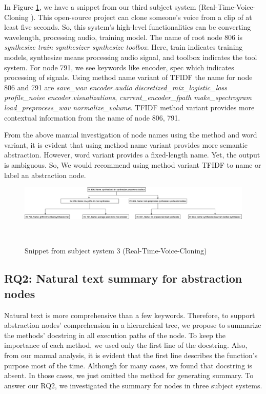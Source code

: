In Figure \ref{fig:rq1_realTime1}, we have a snippet from our third subject system (Real-Time-Voice-Cloning \cite{realTime}). This open-source project can clone someone's voice from a clip of at least five seconds. So, this system's high-level functionalities can be converting wavelength, processing audio, training model. The name of root node 806 is \textit{synthesize train synthesizer synthesize toolbox}. Here, train indicates training models, synthesize means processing audio signal, and toolbox indicates the tool system. For node 791, we see keywords like encoder, spec which indicates processing of signals. Using method name variant of TFIDF the name for node 806 and 791 are \textit{save\_wav encoder.audio discretized\_mix\_logistic\_loss profile\_noise encoder.visualizations}, \textit{current\_encoder\_fpath make\_spectrogram load\_preprocess\_wav normalize\_volume}. TFIDF method variant provides more contextual information from the name of node 806, 791. 

From the above manual investigation of node names using the method and word variant, it is evident that using method name variant provides more semantic abstraction. However, word variant provides a fixed-length  name. Yet, the output is ambiguous. So, We would recommend using method variant TFIDF to name or label an abstraction node.



\begin{figure}[tb]
  \centering
  \includegraphics[width=\columnwidth]{figures/hla2/rq1_realTime1.png}
  \caption{Snippet from subject system 3 (Real-Time-Voice-Cloning)}~\label{fig:rq1_realTime1}
\end{figure}



\subsection{ RQ2: Natural text summary for abstraction nodes}
 Natural text is more comprehensive than a few keywords. Therefore, to support abstraction nodes' comprehension in a hierarchical tree, we propose to summarize the methods' docstring in all execution paths of the node. To keep the importance of each method, we used only the first line of the docstring. Also, from our manual analysis, it is evident that the first line describes the function's purpose most of the time. Although for many cases, we found that docstring is absent. In those cases, we just omitted the method for generating summary. To answer our RQ2, we investigated the summary for nodes in three subject systems. 
 
